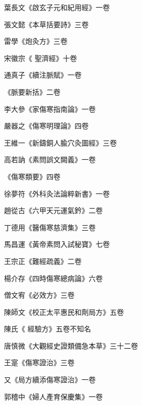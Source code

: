 \begin{pinyinscope}
 葉長文《啟玄子元和紀用經》一卷



 張文懿《本草括要詩》三卷



 雷學《炮灸方》三卷



 宋徽宗《
 聖濟經》十卷



 通真子《續注脈賦》一卷



 《脈要新括》二卷



 李大參《家傷寒指南論》一卷



 嚴器之《傷寒明理論》四卷



 王維一《新鑄銅人腧穴灸圖經》三卷



 高若訥《素問誤文闕義》一卷



 《傷寒類要》四卷



 徐夢符《外科灸法論粹新書》一卷



 趙從古《六甲天元運氣鈐》二卷



 丁德用《醫傷寒慈濟集》三卷



 馬昌運《黃帝素問入試秘寶》七卷



 王宗正《難經疏義》二卷



 楊介存《四時傷寒總病論》六卷



 僧文宥《必效方》三卷



 陳師文《校正太平惠民和劑局方》五卷



 陳氏《
 經驗方》五卷不知名



 唐慎微《大觀經史證類備急本草》三十二卷



 王寔《傷寒證治》三卷



 又《局方續添傷寒證治》一卷



 郭稽中《婦人產育保慶集》一卷




\end{pinyinscope}
